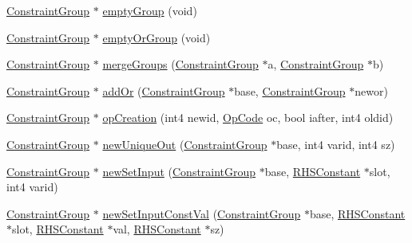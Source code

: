 \begin{DoxyCompactItemize}
\item 
\mbox{\hyperlink{class_constraint_group}{Constraint\+Group}} $\ast$ \mbox{\hyperlink{class_rule_compile_a2e1496d9829f01a64a34e5736f927f3d}{empty\+Group}} (void)
\item 
\mbox{\hyperlink{class_constraint_group}{Constraint\+Group}} $\ast$ \mbox{\hyperlink{class_rule_compile_a48ab97e984ab674b19362ab9c9e59d0b}{empty\+Or\+Group}} (void)
\item 
\mbox{\hyperlink{class_constraint_group}{Constraint\+Group}} $\ast$ \mbox{\hyperlink{class_rule_compile_a34a7af61d06f01e5dbc7e4bf5f30f474}{merge\+Groups}} (\mbox{\hyperlink{class_constraint_group}{Constraint\+Group}} $\ast$a, \mbox{\hyperlink{class_constraint_group}{Constraint\+Group}} $\ast$b)
\item 
\mbox{\hyperlink{class_constraint_group}{Constraint\+Group}} $\ast$ \mbox{\hyperlink{class_rule_compile_a3f191e9f060a35b14439e6caa7711d7b}{add\+Or}} (\mbox{\hyperlink{class_constraint_group}{Constraint\+Group}} $\ast$base, \mbox{\hyperlink{class_constraint_group}{Constraint\+Group}} $\ast$newor)
\item 
\mbox{\hyperlink{class_constraint_group}{Constraint\+Group}} $\ast$ \mbox{\hyperlink{class_rule_compile_aec1c991988bbafa96067c6109f27b0ef}{op\+Creation}} (int4 newid, \mbox{\hyperlink{opcodes_8hh_abeb7dfb0e9e2b3114e240a405d046ea7}{Op\+Code}} oc, bool iafter, int4 oldid)
\item 
\mbox{\hyperlink{class_constraint_group}{Constraint\+Group}} $\ast$ \mbox{\hyperlink{class_rule_compile_a9d9f2cbff620d790c8191f083d4db853}{new\+Unique\+Out}} (\mbox{\hyperlink{class_constraint_group}{Constraint\+Group}} $\ast$base, int4 varid, int4 sz)
\item 
\mbox{\hyperlink{class_constraint_group}{Constraint\+Group}} $\ast$ \mbox{\hyperlink{class_rule_compile_a8072d7258a0b79881a1c74214116ced5}{new\+Set\+Input}} (\mbox{\hyperlink{class_constraint_group}{Constraint\+Group}} $\ast$base, \mbox{\hyperlink{class_r_h_s_constant}{R\+H\+S\+Constant}} $\ast$slot, int4 varid)
\item 
\mbox{\hyperlink{class_constraint_group}{Constraint\+Group}} $\ast$ \mbox{\hyperlink{class_rule_compile_aa7dbcd1052efbe84d398c17727774678}{new\+Set\+Input\+Const\+Val}} (\mbox{\hyperlink{class_constraint_group}{Constraint\+Group}} $\ast$base, \mbox{\hyperlink{class_r_h_s_constant}{R\+H\+S\+Constant}} $\ast$slot, \mbox{\hyperlink{class_r_h_s_constant}{R\+H\+S\+Constant}} $\ast$val, \mbox{\hyperlink{class_r_h_s_constant}{R\+H\+S\+Constant}} $\ast$sz)
\item 

\end{DoxyCompactItemize}
